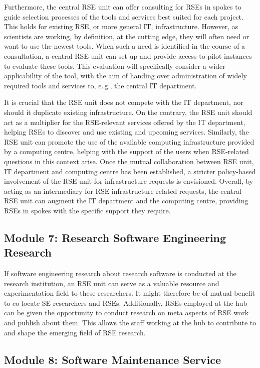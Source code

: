 \documentclass[a4paper]{article}
\makeatletter
\newcommand*{\eg}{e.\,g.\@\xspace}
\makeatother
\begin{document}
Furthermore, the central RSE unit can offer consulting for RSEs in spokes to guide selection processes of the tools and services best suited for each project.
This holds for existing RSE, or more general IT, infrastructure.
However, as scientists are working, by definition, at the cutting edge, they will often need or want to use the newest tools.
When such a need is identified in the course of a consultation, a central RSE unit can set up and provide access to pilot instances to evaluate these tools.
This evaluation will specifically consider a wider applicability of the tool, with the aim of handing over administration of widely required tools and services to, \eg{}, the central IT department.

It is crucial that the RSE unit does not compete with the IT department, nor should it duplicate existing infrastructure.
On the contrary, the RSE unit should act as a multiplier for the RSE-relevant services offered by the IT department, helping RSEs to discover and use existing and upcoming services.
Similarly, the RSE unit can promote the use of the available computing infrastructure provided by a computing centre, helping with the support of the users when RSE-related questions in this context arise.
Once the mutual collaboration between RSE unit, IT department and computing centre has been established, a stricter policy-based involvement of the RSE unit for infrastructure requests is envisioned.
Overall, by acting as an intermediary for RSE infrastructure related requests, the central RSE unit can augment the IT department and the computing centre, providing RSEs in spokes with the specific support they require.

\subsection{Module 7: Research Software Engineering Research}%
\label{sec:rseresearch}

If software engineering research about research software is conducted at the research institution, an RSE unit can serve as a valuable resource and experimentation field to these researchers.
It might therefore be of mutual benefit to co-locate SE researchers and RSEs.
Additionally, RSEs employed at the hub can be given the opportunity to conduct research on meta aspects of RSE work and publish about them.
This allows the staff working at the hub to contribute to and shape the emerging field of RSE research.

\subsection{Module 8: Software Maintenance Service}%
\label{sec:maintenance}
\end{document}
